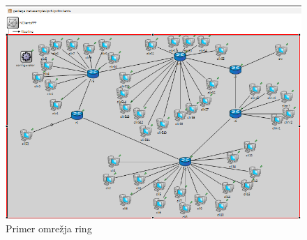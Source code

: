 \documentclass[11pt,a4paper,slovene]{myarticle}
\begin{document}
\begin{figure}[H]
\includegraphics[scale=0.5]{slike/obrocnoOmrezije.png}
\caption{Primer omrežja ring}
\end{figure}
\end{document}
